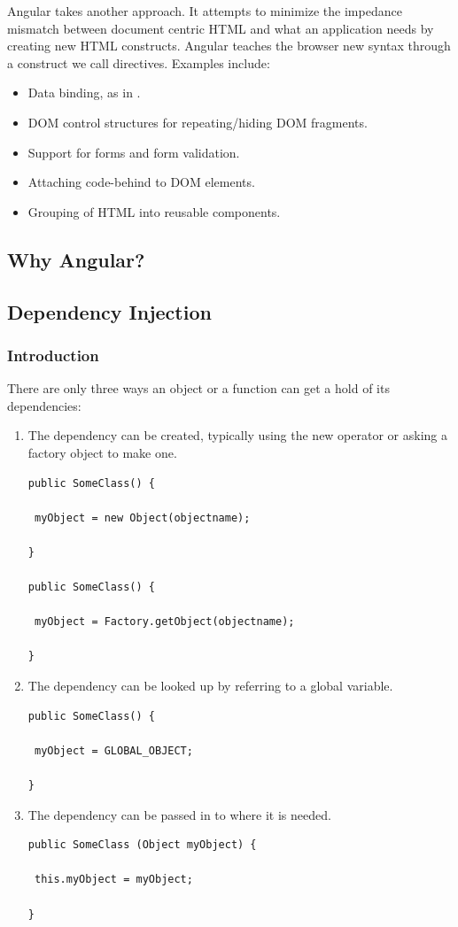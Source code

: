 \documentclass[14pt,a4paper]{extreport}
\begin{document}
Angular takes another approach. It attempts to minimize the impedance mismatch between document centric HTML and what an application needs by creating new HTML constructs. Angular teaches the browser new syntax through a construct we call directives. Examples include:

\begin{itemize}
\item Data binding, as in {{}}.
\item DOM control structures for repeating/hiding DOM fragments.
\item Support for forms and form validation.
\item Attaching code-behind to DOM elements.
\item Grouping of HTML into reusable components.

\end{itemize}
		
		\subsection{Why Angular?}
			
		\subsection{Dependency Injection}
			\subsubsection{Introduction}
			There are only three ways an object or a function can get a hold of its dependencies:
\begin{enumerate}
\item The dependency can be created, typically using the new operator or asking a factory object to make one.
\begin{verbatim}
public SomeClass() {

 myObject = new Object(objectname);

}

public SomeClass() {

 myObject = Factory.getObject(objectname);

}
\end{verbatim}
\item The dependency can be looked up by referring to a global variable.
\begin{verbatim}
public SomeClass() {

 myObject = GLOBAL_OBJECT;

}
\end{verbatim}
\item The dependency can be passed in to where it is needed.
\begin{verbatim}
public SomeClass (Object myObject) {

 this.myObject = myObject;

}
\end{verbatim}

\end{enumerate}
\end{document}
